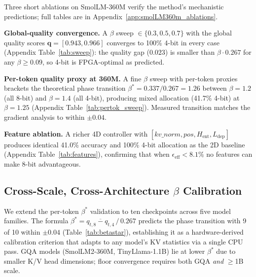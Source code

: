 \documentclass{article}
\begin{document}
Three short ablations on SmolLM-360M verify the method's mechanistic predictions; full tables are in Appendix~\ref{app:smolLM360m_ablations}.

\textbf{Global-quality convergence.} A $\beta$ sweep $\in \{0.3, 0.5, 0.7\}$ with the global quality scores $\mathbf{q}{=}[0.943, 0.966]$ converges to 100\% 4-bit in every case (Appendix Table~\ref{tab:sweep}): the quality gap ($0.023$) is smaller than $\beta \cdot 0.267$ for any $\beta \geq 0.09$, so 4-bit is FPGA-optimal as predicted.

\textbf{Per-token quality proxy at 360M.} A fine $\beta$ sweep with per-token proxies brackets the theoretical phase transition $\beta^* = 0.337/0.267 = 1.26$ between $\beta=1.2$ (all 8-bit) and $\beta=1.4$ (all 4-bit), producing mixed allocation (41.7\% 4-bit) at $\beta=1.25$ (Appendix Table~\ref{tab:pertok_sweep}). Measured transition matches the gradient analysis to within $\pm 0.04$.

\textbf{Feature ablation.} A richer 4D controller with $[kv\_norm, pos, H_\text{ent}, L_\text{dep}]$ produces identical 41.0\% accuracy and 100\% 4-bit allocation as the 2D baseline (Appendix Table~\ref{tab:features}), confirming that when $\epsilon_\text{eff}<8.1\%$ no features can make 8-bit advantageous.

\subsection{Cross-Scale, Cross-Architecture $\beta$ Calibration}
\label{sec:crossarch}

We extend the per-token $\beta^*$ validation to ten checkpoints across five model families. The formula $\beta^* = \overline{q_{t,8}-q_{t,4}}\,/\,0.267$ predicts the phase transition with 9 of 10 within $\pm0.04$ (Table~\ref{tab:betastar}), establishing it as a hardware-derived calibration criterion that adapts to any model's KV statistics via a single CPU pass. GQA models (SmolLM2-360M, TinyLlama-1.1B) lie at lower $\beta^*$ due to smaller K/V head dimensions; floor convergence requires both GQA \emph{and} $\geq$1B scale.
\end{document}

